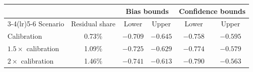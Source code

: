 \begin{tabular}{lccccc}
\toprule
 & & \multicolumn{2}{c}{Bias bounds} & \multicolumn{2}{c}{Confidence bounds}\\
\cmidrule(lr){3-4}\cmidrule(lr){5-6}
Scenario & Residual share & Lower & Upper & Lower & Upper\\
\midrule
Calibration & 0.73\% & $-0.709$ & $-0.645$ & $-0.758$ & $-0.595$\\
$1.5\times$ calibration & 1.09\% & $-0.725$ & $-0.629$ & $-0.774$ & $-0.579$\\
$2\times$ calibration & 1.46\% & $-0.741$ & $-0.613$ & $-0.790$ & $-0.563$\\
\bottomrule
\end{tabular}

